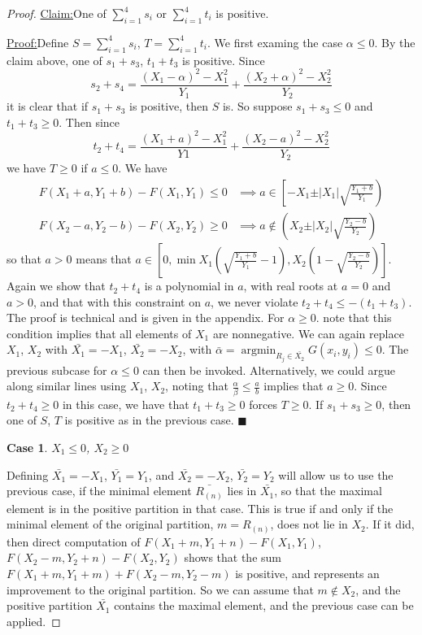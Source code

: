 \documentclass{article}
\theoremstyle{case}
\newtheorem{case}{Case}
\DeclareMathOperator*{\argmin}{argmin} %
\newenvironment{claim}[1]{\par\noindent\underline{Claim:}\space#1}{}
\newenvironment{claimproof}[1]{\par\noindent\underline{Proof:}\space#1}{\hfill $\blacksquare$}
\begin{document}
\begin{proof}
\begin{claim}
One of $\sum_{i=1}^4 s_i$ or $\sum_{i=1}^4 t_i$ is positive.
\end{claim}
\begin{claimproof}
Define $S =\sum_{i=1}^4 s_i$, $T = \sum_{i=1}^4 t_i$. We first examing the case $\alpha \leq 0$. By the claim above, one of $s_1 + s_3$, $t_1 + t_3$ is positive. Since
\[
s_2 + s_4 = \frac{\left( X_1 - \alpha\right)^2 - X_1^2}{Y_1} + \frac{\left( X_2 + \alpha\right)^2 - X_2^2}{Y_2} 
\]
it is clear that if $s_1 + s_3$ is positive, then $S$ is. So suppose $s_1 + s_3 \leq 0$ and $t_1 + t_3 \geq 0$. Then since
\[
t_2 + t_4  = \frac{\left( X_1 + a\right)^2 - X_1^2}{Y1} + \frac{\left( X_2 - a\right)^2 - X_2^2}{Y_2}
\]
we have $T \geq 0$ if $a \leq 0$. We have
\begin{align*}
F(X_1+a, Y_1+b) - F(X_1, Y_1) \leq 0 & \implies a \in \left[ -X_1 \pm \vert X_1\vert \sqrt{\frac{Y_1+b}{Y_1}}\right) \\
F(X_2-a, Y_2-b) - F(X_2, Y_2) \geq 0 & \implies a \not \in \left( X_2 \pm \vert X_2\vert \sqrt{\frac{Y_2 -b}{Y_2}} \right)
\end{align*}
so that $a > 0$ means that $a \in \left[ 0, \min{X_1\left( \sqrt{\frac{Y_1+b}{Y_1}} - 1\right), X_2\left( 1 - \sqrt{\frac{Y_2-b}{Y_2}} \right)}\right]$. Again we show that $t_2 + t_4$ is a polynomial in $a$, with real roots at $a = 0$ and $a > 0$, and that with this constraint on $a$, we never violate $t_2 + t_4 \leq -\left( t_1 + t_3\right)$. The proof is technical and is given in the appendix.
For $\alpha \geq 0$. note that this condition implies that all elements of $X_1$ are nonnegative. We can again replace $X_1$, $X_2$ with $\bar{X_1} = -X_1$, $\bar{X_2} = -X_2$, with $\bar{\alpha} = \argmin_{R_j \in \bar{X_2}} G(x_i, y_i) \leq 0$. The previous subcase for $\alpha \leq 0$ can then be invoked. Alternatively, we could argue along similar lines using $X_1$, $X_2$, noting that $\frac{\alpha}{\beta} \leq \frac{a}{b}$ implies that $a \geq 0$. Since $t_2 + t_4 \geq 0$ in this case, we have that $t_1 + t_3 \geq 0$ forces $T \geq 0$. If $s_1 + s_3 \geq 0$, then one of $S$, $T$ is positive as in the previous case.
\end{claimproof}

\begin{case}
$X_1 \leq 0$, $X_2 \geq 0$
\end{case}
Defining $\bar{X_1} = -X_1$, $\bar{Y_1} = Y_1$, and $\bar{X_2} = -X_2$, $\bar{Y_2} = Y_2$ will allow us to use the previous case, if the minimal element $\bar{R_{(n)}}$ lies in $\bar{X_1}$, so that the maximal element is in the positive partition in that case. This is true if and only if the minimal element of the original partition, $m = R_{(n)}$, does not lie in $X_2$. If it did, then direct computation of $F(X_1 + m, Y_1 + n) - F(X_1, Y_1)$, $F(X_2 - m, Y_2 + n) - F(X_2, Y_2)$ shows that the sum $F(X_1 + m, Y_1 + m) + F(X_2 - m, Y_2 - m)$ is positive, and represents an improvement to the original partition. So we can assume that $m \not \in X_2$, and the positive partition $\bar{X_1}$ contains the maximal element, and the previous case can be applied.


\end{proof}
\end{document}
